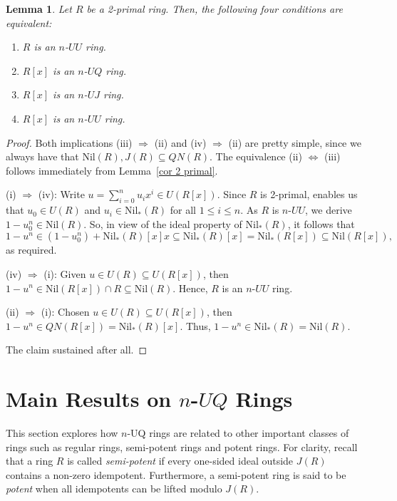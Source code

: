 \documentclass[10pt,a4paper]{amsart}
\newtheorem{lemma}[theorem]{Lemma}
\begin{document}
\begin{lemma}
Let $R$ be a 2-primal ring. Then, the following four conditions are equivalent:
\begin{enumerate}
\item
$R$ is an $n$-$UU$ ring.
\item
$R[x]$ is an $n$-$UQ$ ring.
\item
$R[x]$ is an $n$-$UJ$ ring.
\item
$R[x]$ is an $n$-$UU$ ring.
\end{enumerate}
\end{lemma}

\begin{proof}
Both implications (iii) \( \Rightarrow \) (ii) and (iv) \( \Rightarrow \) (ii) are pretty simple, since we always have that \( \text{Nil}(R), J(R) \subseteq QN(R) \). The equivalence (ii) \( \Leftrightarrow \) (iii) follows immediately from Lemma~\ref{cor 2 primal}.

(i) \( \Rightarrow \) (iv): Write \( u = \sum_{i=0}^n u_i x^i \in U(R[x]) \). Since \( R \) is 2-primal, \cite[Theorem 2.5]{Chenpr} enables us that \( u_0 \in U(R) \) and \( u_i \in \text{Nil}_*(R) \) for all \( 1 \leq i \leq n \).
As \( R \) is $n$-$UU$, we derive \( 1 - u_0^n \in \text{Nil}(R) \). So, in view of the ideal property of \( \text{Nil}_*(R) \), it follows that
\[
1 - u^n \in (1 - u_0^n) + \text{Nil}_*(R)[x]x \subseteq \text{Nil}_*(R)[x] = \text{Nil}_*(R[x]) \subseteq \text{Nil}(R[x]),
\]
as required.

(iv) \( \Rightarrow \) (i): Given \( u \in U(R) \subseteq U(R[x]) \), then \( 1 - u^n \in \text{Nil}(R[x]) \cap R \subseteq \text{Nil}(R) \). Hence, \( R \) is an $n$-$UU$ ring.

(ii) \( \Rightarrow \) (i): Chosen \( u \in U(R) \subseteq U(R[x]) \), then \( 1 - u^n \in QN(R[x]) = \text{Nil}_*(R)[x] \). Thus, \( 1 - u^n \in \text{Nil}_*(R) = \text{Nil}(R) \).

The claim sustained after all.
\end{proof}

\section{Main Results on $n$-$UQ$ Rings}

This section explores how $n$-UQ rings are related to other important classes of rings such as regular rings, semi-potent rings and potent rings. For clarity, recall that a ring $R$ is called {\it semi-potent} if every one-sided ideal outside $J(R)$ contains a non-zero idempotent. Furthermore, a semi-potent ring is said to be {\it potent} when all idempotents can be lifted modulo $J(R)$.
\end{document}
